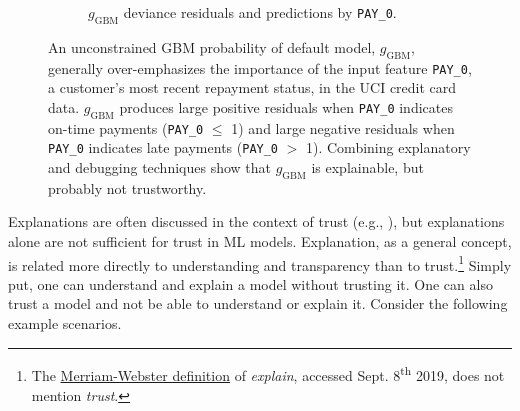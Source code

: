\documentclass{article}
\begin{document}
\begin{figure}[htb!]
\begin{subfigure}{.5\textwidth}
  		\caption{$g_{\text{GBM}}$ deviance residuals and predictions by \texttt{PAY\_0}.}
  		\label{fig:resid}
	\end{subfigure}
	\caption{An unconstrained GBM probability of default model, $g_{\text{GBM}}$, generally over-emphasizes the importance of the input feature \texttt{PAY\_0}, a customer's most recent repayment status, in the UCI credit card data. $g_{\text{GBM}}$ produces large positive residuals when \texttt{PAY\_0} indicates on-time payments (\texttt{PAY\_0} $\leq$ 1) and large negative residuals when \texttt{PAY\_0} indicates late payments (\texttt{PAY\_0} $>$ 1). Combining explanatory and debugging techniques show that $g_{\text{GBM}}$ is explainable, but probably not trustworthy.}
	\label{fig:global_shap_resid}
\end{figure}

Explanations are often discussed in the context of trust (e.g., \citet{lime}), but explanations alone are not sufficient for trust in ML models. Explanation, as a general concept, is related more directly to understanding and transparency than to trust.\footnote{\scriptsize{The \href{https://www.merriam-webster.com/dictionary/explain}{Merriam-Webster definition} of \textit{explain}, accessed Sept. 8\textsuperscript{th} 2019, does not mention \textit{trust}.}} Simply put, one can understand and explain a model without trusting it. One can also trust a model and not be able to understand or explain it. Consider the following example scenarios.
\end{document}
